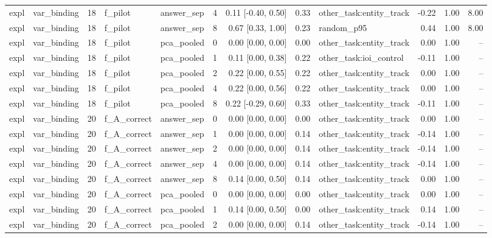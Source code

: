 \begin{tabular}{llrllrrrlrrr}
expl & var\_binding & 18 & f\_pilot & answer\_sep & 4 & 0.11 [-0.40, 0.50] & 0.33 & other\_task:entity\_track & -0.22 & 1.00 & 8.00 \\
expl & var\_binding & 18 & f\_pilot & answer\_sep & 8 & 0.67 [0.33, 1.00] & 0.23 & random\_p95 & 0.44 & 1.00 & 8.00 \\
expl & var\_binding & 18 & f\_pilot & pca\_pooled & 0 & 0.00 [0.00, 0.00] & 0.00 & other\_task:entity\_track & 0.00 & 1.00 & -- \\
expl & var\_binding & 18 & f\_pilot & pca\_pooled & 1 & 0.11 [0.00, 0.38] & 0.22 & other\_task:ioi\_control & -0.11 & 1.00 & -- \\
expl & var\_binding & 18 & f\_pilot & pca\_pooled & 2 & 0.22 [0.00, 0.55] & 0.22 & other\_task:entity\_track & 0.00 & 1.00 & -- \\
expl & var\_binding & 18 & f\_pilot & pca\_pooled & 4 & 0.22 [0.00, 0.56] & 0.22 & other\_task:entity\_track & 0.00 & 1.00 & -- \\
expl & var\_binding & 18 & f\_pilot & pca\_pooled & 8 & 0.22 [-0.29, 0.60] & 0.33 & other\_task:entity\_track & -0.11 & 1.00 & -- \\
expl & var\_binding & 20 & f\_A\_correct & answer\_sep & 0 & 0.00 [0.00, 0.00] & 0.00 & other\_task:entity\_track & 0.00 & 1.00 & -- \\
expl & var\_binding & 20 & f\_A\_correct & answer\_sep & 1 & 0.00 [0.00, 0.00] & 0.14 & other\_task:entity\_track & -0.14 & 1.00 & -- \\
expl & var\_binding & 20 & f\_A\_correct & answer\_sep & 2 & 0.00 [0.00, 0.00] & 0.14 & other\_task:entity\_track & -0.14 & 1.00 & -- \\
expl & var\_binding & 20 & f\_A\_correct & answer\_sep & 4 & 0.00 [0.00, 0.00] & 0.14 & other\_task:entity\_track & -0.14 & 1.00 & -- \\
expl & var\_binding & 20 & f\_A\_correct & answer\_sep & 8 & 0.14 [0.00, 0.50] & 0.14 & other\_task:entity\_track & 0.00 & 1.00 & -- \\
expl & var\_binding & 20 & f\_A\_correct & pca\_pooled & 0 & 0.00 [0.00, 0.00] & 0.00 & other\_task:entity\_track & 0.00 & 1.00 & -- \\
expl & var\_binding & 20 & f\_A\_correct & pca\_pooled & 1 & 0.14 [0.00, 0.50] & 0.00 & other\_task:entity\_track & 0.14 & 1.00 & -- \\
expl & var\_binding & 20 & f\_A\_correct & pca\_pooled & 2 & 0.00 [0.00, 0.00] & 0.14 & other\_task:entity\_track & -0.14 & 1.00 & -- \\

\end{tabular}
